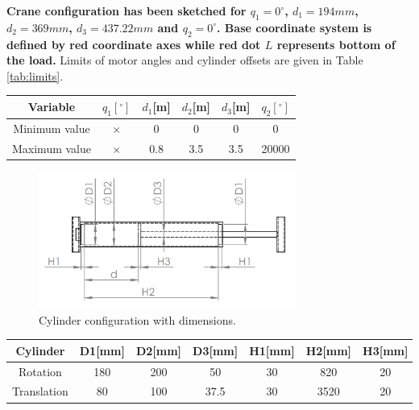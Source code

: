 \documentclass{article}
\begin{document}
	\noindent
	\textbf{Crane configuration has been sketched for $q_1 = 0 ^\circ$, $d_1 = 
	194mm$, $d_2 = 369mm$, $d_3 = 437.22mm$ and $q_2 = 0 ^\circ$. Base 
	coordinate system is defined by red coordinate axes while red dot $L$ 
	represents bottom of the load.} Limits of motor angles and cylinder offsets 
	are given in Table \ref{tab:limits}.
	
	\begin{center}
		\label{tab:limits}
		\begin{tabular}{|| c || c c c c c ||}
			\hline
			Variable & $q_1[^{\circ}]$ & $d_1$[m] & $d_2$[m] & $d_3$[m] &  
			$q_2[^{\circ}]$\\
			\hline\hline
			Minimum value & $\times$ & 0 & 0 & 0 & 0 \\ 
			\hline
			Maximum value & $\times$ & 0.8 & 3.5 & 3.5 & 20000 \\ 
			\hline
		\end{tabular}
	\end{center}
	
	\begin{figure}
		\centering
		\includegraphics[width=0.75\textwidth]{cilindar_shema.jpg}
		\caption{Cylinder configuration with dimensions.}
		\label{fig:cylinder_conf}
	\end{figure}
	
	\begin{center}
		\label{tab:cylinder_tab}
		\begin{tabular}{||c|| c c c || c c c ||}
			\hline
			Cylinder & D1[mm] & D2[mm] &  D3[mm] & H1[mm] & H2[mm] & H3[mm] \\
			\hline\hline
			Rotation & 180 & 200 & 50 & 30 & 820 & 20\\ 
			\hline
			Translation & 80 & 100 & 37.5 & 30 & 3520 & 20 \\
			\hline
		\end{tabular}
	\end{center}
	
\end{document}
